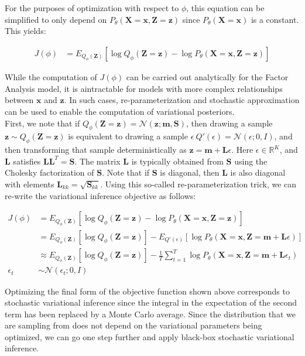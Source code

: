 \documentclass[11pt]{article}
\newcommand{\mbf}[1]{{\mathbf{#1}}}
\begin{document}
For the purposes of optimization with respect to $\phi$, this equation can be simplified to only depend on $P_{\theta}(\mbf{X}=\mbf{x},\mbf{Z}=\mbf{z})$ since $P_{\theta}(\mbf{X}=\mbf{x})$ is a constant.
This yields:

\begin{align}
	\label{eq:vi}
	J(\phi) &=E_{Q_{\phi}(\mbf{Z})}[\log Q_{\phi}(\mbf{Z}=\mbf{z}) - \log P_{\theta}(\mbf{X}=\mbf{x},\mbf{Z}=\mbf{z}) ]
\end{align}

While the computation of $J(\phi)$ can be carried out analytically for the Factor Analysis model, it is 
aintractable for models with more complex relationships between $\mbf{x}$ and $\mbf{z}$.
In such cases, re-parameterization and stochastic approximation can be used to enable
the computation of variational posteriors. \\

First, we note that if 
$Q_{\phi}(\mbf{Z}=\mbf{z})=\mathcal{N}(\mbf{z};\mbf{m},\mbf{S})$, then drawing
a sample $\mbf{z}\sim Q_{\phi}(\mbf{Z}=\mbf{z})$ is equivalent to drawing a sample
$\epsilon ~ Q'(\epsilon) = \mathcal{N}(\epsilon; 0, I)$, and then transforming that sample deterministically 
as $\mbf{z} = \mbf{m} + \mbf{L}\epsilon$. Here $\epsilon \in \mathbb{R}^K$, and $\mbf{L}$ satisfies 
$\mbf{L}\mbf{L}^T=\mbf{S}$. The matrix $\mbf{L}$ is typically obtained from $\mbf{S}$
using the Cholesky factorization of $\mbf{S}$. Note that if $\mbf{S}$ is diagonal,
then $\mbf{L}$ is also diagonal with elements $\mbf{L}_{kk} = \sqrt{\mbf{S}_{kk}}$.
Using this so-called re-parameterization trick, we can re-write the variational
inference objective as follows:

\begin{align}
	J(\phi)  &=E_{Q_{\phi}(\mbf{Z})}[\log Q_{\phi}(\mbf{Z}=\mbf{z}) 
	   - \log P_{\theta}(\mbf{X}=\mbf{x},\mbf{Z}=\mbf{z}) ] \\
	&=E_{Q_{\phi}(\mbf{Z})}[\log Q_{\phi}(\mbf{Z}=\mbf{z})] 
	  - E_{Q'(\epsilon)}[\log P_{\theta}(\mbf{X}=\mbf{x}, \mbf{Z}=\mbf{m}+\mbf{L}\epsilon)]\\
	\label{eq:SVI}
	&\approx E_{Q_{\phi}(\mbf{Z})}[\log Q_{\phi}(\mbf{Z}=\mbf{z})] 
	    - \frac{1}{T} \sum_{t=1}^T \log P_{\theta}(\mbf{X}=\mbf{x},\mbf{Z}=\mbf{m}+\mbf{L}\epsilon_t)\\
\nonumber 	\epsilon_t&\sim \mathcal{N}(\epsilon_t; 0, I)
\end{align}

Optimizing the final form of the objective function shown above corresponds to stochastic 
variational inference since the integral in the expectation of the second term 
has been replaced by a Monte Carlo average. Since the distribution that we are sampling from
does not depend on the variational parameters being optimized, we can go one step
further and apply black-box stochastic variational inference. \\
\end{document}
